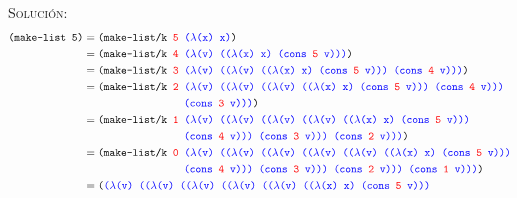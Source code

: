 \documentclass[letterpaper,11pt]{article}
\begin{document}
\begin{enumerate}
    \textsc{Solución:}
    \begin{align*}
        \texttt{(make-list 5)} 
        &= \texttt{(make-list/k \textcolor{red}{5} 
                                \textcolor{blue}{($\lambda$(x) x)})} \\ 
        &= \texttt{(make-list/k \textcolor{red}{4}
                                \textcolor{blue}{($\lambda$(v) (($\lambda$(x) x) (cons \textcolor{red}{5} v)))})} \\ 
        &= \texttt{(make-list/k \textcolor{red}{3}
                                \textcolor{blue}{($\lambda$(v) (($\lambda$(v) (($\lambda$(x) x) (cons \textcolor{red}{5} v))) (cons \textcolor{red}{4} v)))})} \\ 
        &= \texttt{(make-list/k \textcolor{red}{2}
                                \textcolor{blue}{($\lambda$(v) (($\lambda$(v) (($\lambda$(v) (($\lambda$(x) x) (cons \textcolor{red}{5} v))) (cons \textcolor{red}{4} v)))}} \\ 
        &\; \; \; \; \; \; \; \; \; \; \; \; \; \; \; \; \; \; \; \; \; \; \; \; 
        \; \; \; \; \; \; \; \; \; 
                                \texttt{\textcolor{blue}{(cons \textcolor{red}{3} v)))})} \\ 
        &= \texttt{(make-list/k \textcolor{red}{1}
                                \textcolor{blue}{($\lambda$(v) (($\lambda$(v) (($\lambda$(v) (($\lambda$(v) (($\lambda$(x) x) (cons \textcolor{red}{5} v)))}} \\  
        &\; \; \; \; \; \; \; \; \; \; \; \; \; \; \; \; \; \; \; \; \; \; \; \; 
        \; \; \; \; \; \; \; \; \; 
        \texttt{\textcolor{blue}{(cons \textcolor{red}{4} v))) (cons \textcolor{red}{3} v))) (cons \textcolor{red}{2} v)))})} \\ 
        &= \texttt{(make-list/k \textcolor{red}{0}
                                \textcolor{blue}{($\lambda$(v) (($\lambda$(v) (($\lambda$(v) (($\lambda$(v) (($\lambda$(v) (($\lambda$(x) x) (cons \textcolor{red}{5} v)))}} \\ 
        &\; \; \; \; \; \; \; \; \; \; \; \; \; \; \; \; \; \; \; \; \; \; \; \; 
        \; \; \; \; \; \; \; \; \; 
        \texttt{\textcolor{blue}{(cons \textcolor{red}{4} v))) (cons \textcolor{red}{3} v))) (cons \textcolor{red}{2} v))) (cons \textcolor{red}{1} v)))})} \\ 
        &= \texttt{(\textcolor{blue}{($\lambda$(v) (($\lambda$(v) (($\lambda$(v) (($\lambda$(v) (($\lambda$(v) (($\lambda$(x) x) (cons \textcolor{red}{5} v)))}} \\ 
        &\; \; \; \; \; 

\end{align*}
\end{enumerate}
\end{document}
